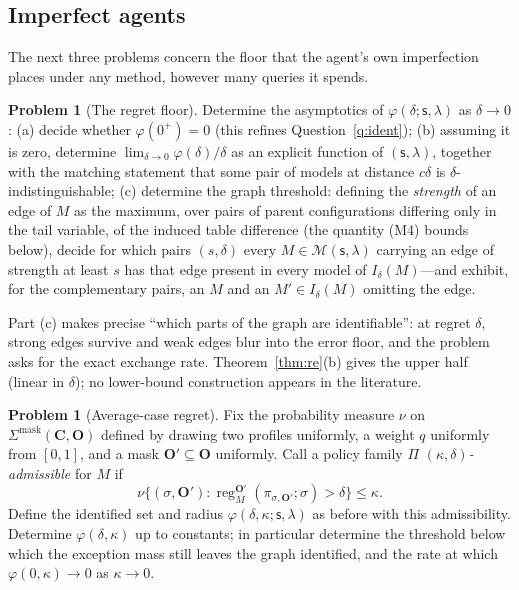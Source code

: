\documentclass[11pt]{amsart}
\theoremstyle{plain}
\theoremstyle{definition}
\newtheorem{problem}[theorem]{Problem}
\DeclareMathOperator{\reg}{reg}
\newcommand{\bC}{\mathbf{C}}
\newcommand{\bO}{\mathbf{O}}
\newcommand{\MM}{\mathcal{M}}
\newcommand{\sk}{\mathsf{s}}
\begin{document}
\subsection{Imperfect agents}

The next three problems concern the floor that the agent's own imperfection places under any method, however many queries it spends.

\begin{problem}[The regret floor]\label{prob:floor}
Determine the asymptotics of $\varphi(\delta;\sk,\lambda)$ as $\delta\to0$: (a) decide whether $\varphi(0^+)=0$ (this refines Question~\ref{q:ident}); (b) assuming it is zero, determine $\lim_{\delta\to0}\varphi(\delta)/\delta$ as an explicit function of $(\sk,\lambda)$, together with the matching statement that some pair of models at distance $c\delta$ is $\delta$-indistinguishable; (c) determine the graph threshold: defining the \emph{strength} of an edge of $M$ as the maximum, over pairs of parent configurations differing only in the tail variable, of the induced table difference (the quantity (M4) bounds below), decide for which pairs $(s,\delta)$ every $M\in\MM(\sk,\lambda)$ carrying an edge of strength at least $s$ has that edge present in every model of $I_\delta(M)$---and exhibit, for the complementary pairs, an $M$ and an $M'\in I_\delta(M)$ omitting the edge.
\end{problem}

Part (c) makes precise ``which parts of the graph are identifiable'': at regret $\delta$, strong edges survive and weak edges blur into the error floor, and the problem asks for the exact exchange rate. Theorem~\ref{thm:re}(b) gives the upper half (linear in $\delta$); no lower-bound construction appears in the literature.

\begin{problem}[Average-case regret]\label{prob:average}
Fix the probability measure $\nu$ on $\Sigma^\mathrm{mask}(\bC,\bO)$ defined by drawing two profiles uniformly, a weight $q$ uniformly from $[0,1]$, and a mask $\bO'\subseteq\bO$ uniformly. Call a policy family $\Pi$ \emph{$(\kappa,\delta)$-admissible} for $M$ if
\[
   \nu\{(\sigma,\bO'):\reg_M^{\bO'}(\pi_{\sigma,\bO'};\sigma)>\delta\}\le\kappa.
\]
Define the identified set and radius $\varphi(\delta,\kappa;\sk,\lambda)$ as before with this admissibility. Determine $\varphi(\delta,\kappa)$ up to constants; in particular determine the threshold below which the exception mass still leaves the graph identified, and the rate at which $\varphi(0,\kappa)\to0$ as $\kappa\to0$.
\end{problem}
\end{document}
